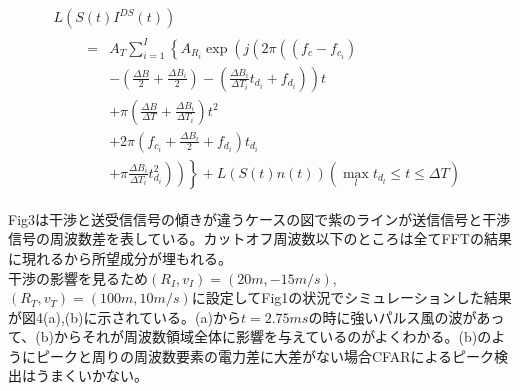 \begin{equation}
    \begin{array}{l}
    L\left(S(t) I^{D S}(t)\right) \\
    \qquad \begin{aligned}
    =& A_{T} \sum_{i=1}^{I}\left\{A _ { R _ { i } } \operatorname { e x p } \left(j \left(2 \pi \left(\left(f_{c}-f_{c_{i}}\right)\right.\right.\right.\right.\\
    &\left.-\left(\frac{\Delta B}{2}+\frac{\Delta B_{i}}{2}\right)-\left(\frac{\Delta B_{i}}{\Delta T_{i}} t_{d_{i}}+f_{d_{i}}\right)\right) t \\
    &+\pi\left(\frac{\Delta B}{\Delta T}+\frac{\Delta B_{i}}{\Delta T_{i}}\right) t^{2} \\
    &+2 \pi\left(f_{c_{i}}+\frac{\Delta B_{i}}{2}+f_{d_{i}}\right) t_{d_{i}} \\
    &\left.\left.\left.+\pi \frac{\Delta B_{i}}{\Delta T_{i}} t_{d_{i}}^{2}\right)\right)\right\}+L(S(t) n(t))\left(\max _{l} t_{d_{l}} \leq t \leq \Delta T\right)
    \end{aligned}
    \end{array}
\end{equation}

Fig3は干渉と送受信信号の傾きが違うケースの図で紫のラインが送信信号と干渉信号の周波数差を表している。カットオフ周波数以下のところは全てFFTの結果に現れるから所望成分が埋もれる。\\
干渉の影響を見るため$(R_I,v_I) = (20m, -15m/s)$, $(R_T, v_T) = (100m, 10m/s)$に設定してFig1の状況でシミュレーションした結果が図4(a),(b)に示されている。(a)から$t=2.75ms$の時に強いパルス風の波があって、(b)からそれが周波数領域全体に影響を与えているのがよくわかる。(b)のようにピークと周りの周波数要素の電力差に大差がない場合CFARによるピーク検出はうまくいかない。

